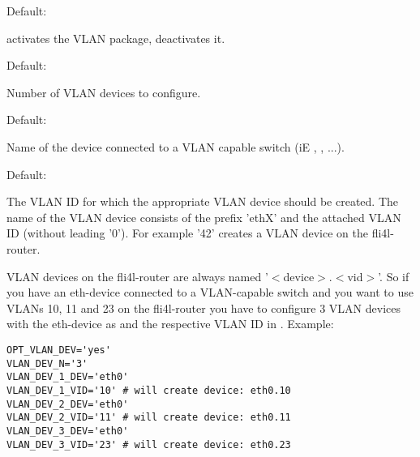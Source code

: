 \begin{description}


  Default: 

   activates the VLAN package,  deactivates it.


  Default: 

  Number of VLAN devices to configure.


  Default: 

  Name of the device connected to a VLAN capable switch (iE , , ...).


  Default: 

  The VLAN ID for which the appropriate VLAN device should be created. 
  The name of the VLAN device consists of the prefix 'ethX'
  and the attached VLAN ID (without leading '0'). For example '42'
  creates a VLAN device  on the fli4l-router.
  
\end{description}

  VLAN devices on the fli4l-router are always named '$<$device$>$.$<$vid$>$'. 
  So if you have an eth-device connected to a VLAN-capable switch
  and you want to use VLANs 10, 11 and 23 on the fli4l-router you have to 
  configure 3 VLAN devices with the eth-device as 
  and the respective VLAN ID in . 
  Example:
\begin{example}
\begin{verbatim}
OPT_VLAN_DEV='yes'
VLAN_DEV_N='3'
VLAN_DEV_1_DEV='eth0'
VLAN_DEV_1_VID='10'	# will create device: eth0.10
VLAN_DEV_2_DEV='eth0'
VLAN_DEV_2_VID='11'	# will create device: eth0.11
VLAN_DEV_3_DEV='eth0'
VLAN_DEV_3_VID='23'	# will create device: eth0.23
\end{verbatim}
\end{example}


